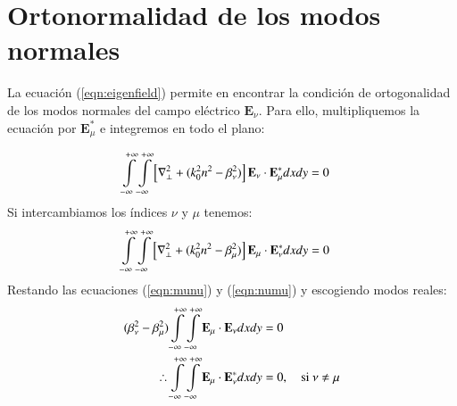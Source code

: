 \chapter{Ortonormalidad de los modos normales \label{sec:orto}}

La ecuación (\ref{eqn:eigenfield}) permite en encontrar la condición de ortogonalidad de los modos normales del campo eléctrico  $\textbf{E}_\nu$. Para ello, multipliquemos la ecuación por $\textbf{E}_\mu^*$ e integremos en todo el plano:

\begin{align}
	 \int\displaylimits_{-\infty}^{+\infty}\int\displaylimits_{-\infty}^{+\infty}\left[  \nabla_\perp^2  + (k_0^2n^2 - \beta_\nu^2) \right]\textbf{E}_\nu \cdot\textbf{E}_\mu^* dxdy &=  0 \label{eqn:munu}
\end{align}
Si intercambiamos los índices $\nu$ y $\mu$ tenemos:
\begin{align}
	 	 \int\displaylimits_{-\infty}^{+\infty}\int\displaylimits_{-\infty}^{+\infty}\left[  \nabla_\perp^2  + (k_0^2n^2 - \beta_\mu^2) \right]\textbf{E}_\mu \cdot\textbf{E}_\nu^* dxdy &=  0 \label{eqn:numu}
\end{align}
Restando las ecuaciones (\ref{eqn:munu}) y (\ref{eqn:numu}) y escogiendo modos reales:
\begin{align*}
	 	 (\beta_\nu^2-\beta_\mu^2)\int\displaylimits_{-\infty}^{+\infty}\int\displaylimits_{-\infty}^{+\infty}\textbf{E}_\mu \cdot\textbf{E}_\nu dxdy &=  0
	 	 \\
	 	 \therefore \int\displaylimits_{-\infty}^{+\infty}\int\displaylimits_{-\infty}^{+\infty}\textbf{E}_\mu \cdot\textbf{E}_\nu^* dxdy &= 0, \quad \text{si } \nu\neq\mu
\end{align*}